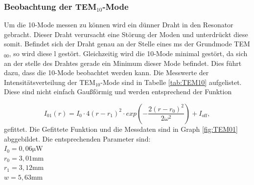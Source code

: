 \subsubsection{Beobachtung der TEM$_{10}$-Mode}
\label{sec:Beobachtung der EINFÜGEN-Mode}
Um die 10-Mode messen zu können wird ein dünner Draht in den Resonator gebracht.
Dieser Draht verursacht eine Störung der Moden und unterdrückt diese somit. Befindet sich der Draht genau an der Stelle eines ms der Grundmode TEM$_{00}$, so wird diese l gestört.
Gleichzeitig wird die 10-Mode minimal gestört, da sich an der stelle des Drahtes gerade ein Minimum dieser Mode befindet. Dies führt dazu, dass die 10-Mode beobachtet werden kann.
Die Messwerte der Intensitätsverteilung der TEM$_{10}$-Mode sind in Tabelle \ref{tab:TEM10} aufgelistet. Diese sind nicht einfach Gaußförmig und werden entsprechend der Funktion

\begin{equation}
  I_{01}(r) = I_0 \cdot 4 (r - r_1)^2 \cdot exp \left( - \frac{2 (r - r_0)^2}{2 \omega^2}\right) + I_{\text{off}},
\end{equation}
gefittet. Die Gefittete Funktion und die Messdaten sind in Graph \ref{fig:TEM01} abggebildet.
Die entsprechenden Parameter sind: \\
$I_0 = 0,06 \si{\micro\watt}$ \\
$r_0 = 3,01 \si{\milli\meter}$ \\
$r_1 = 3,12 \si{\milli\meter}$ \\
$w = 5,63 \si{\milli\meter}$ \\



